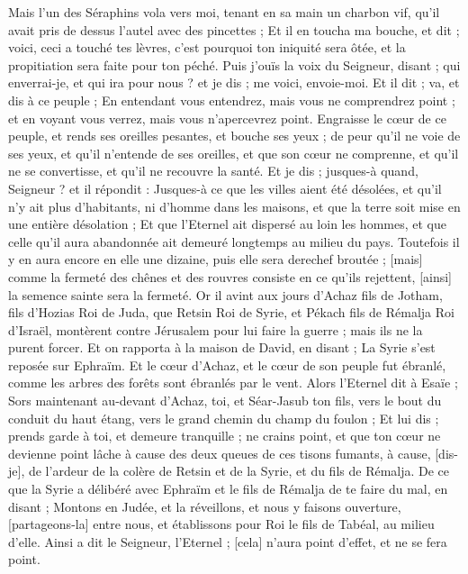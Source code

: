 \begin{multicols}{2}
Mais l'un des Séraphins vola vers moi, tenant en sa main un charbon vif, qu'il avait pris de dessus l'autel avec des pincettes ;
Et il en toucha ma bouche, et dit ; voici, ceci a touché tes lèvres, c'est pourquoi ton iniquité sera ôtée, et la propitiation sera faite pour ton péché.
Puis j'ouïs la voix du Seigneur, disant ; qui enverrai-je, et qui ira pour nous ? et je dis ; me voici, envoie-moi.
Et il dit ; va, et dis à ce peuple ; En entendant vous entendrez, mais vous ne comprendrez point ; et en voyant vous verrez, mais vous n'apercevrez point.
Engraisse le cœur de ce peuple, et rends ses oreilles pesantes, et bouche ses yeux ; de peur qu'il ne voie de ses yeux, et qu'il n'entende de ses oreilles, et que son cœur ne comprenne, et qu'il ne se convertisse, et qu'il ne recouvre la santé.
Et je dis ; jusques-à quand, Seigneur ? et il répondit : Jusques-à ce que les villes aient été désolées, et qu'il n'y ait plus d'habitants, ni d'homme dans les maisons, et que la terre soit mise en une entière désolation ;
Et que l'Eternel ait dispersé au loin les hommes, et que celle qu'il aura abandonnée ait demeuré longtemps au milieu du pays.
Toutefois il y en aura encore en elle une dizaine, puis elle sera derechef broutée ; [mais] comme la fermeté des chênes et des rouvres consiste en ce qu'ils rejettent, [ainsi] la semence sainte sera la fermeté.
\VerseOne{}Or il avint aux jours d'Achaz fils de Jotham, fils d'Hozias Roi de Juda, que Retsin Roi de Syrie, et Pékach fils de Rémalja Roi d'Israël, montèrent contre Jérusalem pour lui faire la guerre ; mais ils ne la purent forcer.
Et on rapporta à la maison de David, en disant ; La Syrie s'est reposée sur Ephraïm. Et le cœur d'Achaz, et le cœur de son peuple fut ébranlé, comme les arbres des forêts sont ébranlés par le vent.
Alors l'Eternel dit à Esaïe ; Sors maintenant au-devant d'Achaz, toi, et Séar-Jasub ton fils, vers le bout du conduit du haut étang, vers le grand chemin du champ du foulon ;
Et lui dis ; prends garde à toi, et demeure tranquille ; ne crains point, et que ton cœur ne devienne point lâche à cause des deux queues de ces tisons fumants, à cause, [dis-je], de l'ardeur de la colère de Retsin et de la Syrie, et du fils de Rémalja.
De ce que la Syrie a délibéré avec Ephraïm et le fils de Rémalja de te faire du mal, en disant ;
Montons en Judée, et la réveillons, et nous y faisons ouverture, [partageons-la] entre nous, et établissons pour Roi le fils de Tabéal, au milieu d'elle.
Ainsi a dit le Seigneur, l'Eternel ; [cela] n'aura point d'effet, et ne se fera point.

\end{multicols}
